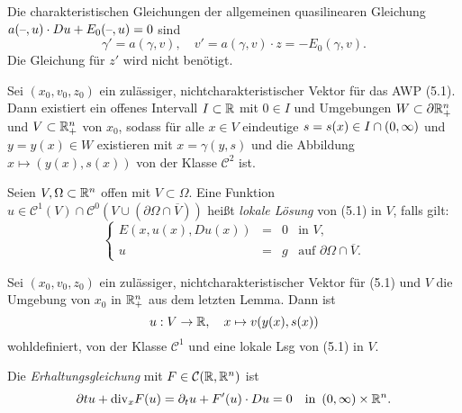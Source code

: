 \documentclass{cheat-sheet}
\newcommand{\dive}{\mathrm{div}} %
\begin{document}

\begin{bsp}
  Die charakteristischen Gleichungen der allgemeinen quasilinearen Gleichung $a(\text{--}, u) \cdot D u + E_0(\text{--}, u) = 0$ sind
  \[ \gamma' = a(\gamma, v), \quad v' = a(\gamma, v) \cdot z = - E_0(\gamma, v). \]
  Die Gleichung für $z'$ wird nicht benötigt.
\end{bsp}

\begin{lem}
  Sei $(x_0, v_0, z_0)$ ein zulässiger, nichtcharakteristischer Vektor für das AWP (5.1). Dann existiert ein offenes Intervall $I \subset \mathbb{R}$ mit $0 \in I$ und Umgebungen $W \subset \partial \mathbb{R}^n_{+}$ und $V \subset \mathbb{R}^n_+$ von $x_0$, sodass für alle $x \in V$ eindeutige $s = s(x) \in I \cap \left( 0, \infty \right)$ und $y = y(x) \in W$ existieren mit $x = \gamma(y, s)$ und die Abbildung $x \mapsto (y(x), s(x))$ von der Klasse $\mathcal{C}^2$ ist.
\end{lem}

\begin{defn}
  Seien $V, \Omega \subset \mathbb{R}^n$ offen mit $V \subset \Omega$. Eine Funktion $u \in \mathcal{C}^1(V) \cap \mathcal{C}^0(V \cup (\partial \Omega \cap \overline{V}))$ heißt \emph{lokale Lösung} von (5.1) in $V$, falls gilt:
  \[
    \left\{ \begin{array}{rlll}
      E(x, u(x), D u(x)) & = & 0 & \text{in } V, \\
      u & = & g & \text{auf } \partial \Omega \cap \overline{V}.
    \end{array} \right.
  \]
\end{defn}

\begin{satz}
  Sei $(x_0, v_0, z_0)$ ein zulässiger, nichtcharakteristischer Vektor für (5.1) und $V$ die Umgebung von $x_0$ in $\mathbb{R}^n_{+}$ aus dem letzten Lemma. Dann ist
  \[ u : V \to \mathbb{R}, \quad x \mapsto v(y(x), s(x)) \]
  wohldefiniert, von der Klasse $\mathcal{C}^1$ und eine lokale Lsg von (5.1) in $V$.
\end{satz}




\begin{prob}
  Die \emph{Erhaltungsgleichung} mit $F \in \mathcal{C}(\mathbb{R}, \mathbb{R}^n)$ ist
  \[
    \partial t u + \dive_x F(u) = \partial_t u + F'(u) \cdot Du = 0
    \quad \text{in } \ointerval{0}{\infty} \times \R^n.
  \]
\end{prob}
\end{document}
